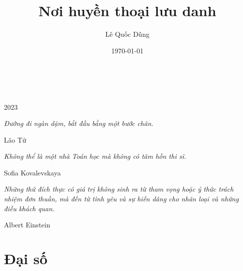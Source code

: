 \documentclass[oneside]{book}
\title{Nơi huyền thoại lưu danh}
\author{Lê Quốc Dũng}
\date{\today}
\begin{document}
\begin{titlepage}
		\\
			
		\vspace{10mm}
		\\
		\vspace{\fill}
		\centering \large{2023}
\end{titlepage}

\newpage

\vspace*{2cm}

\begin{center}
	{\Large 
			\textit{Đường đi ngàn dặm, bắt đầu bằng một bước chân.}
	}
	\Large{\parbox{10cm}{
		\begin{raggedleft}
		\vspace{.5cm}\hfill{Lão Tử}
		\end{raggedleft}
	}
}
\end{center}

\begin{center}
	{\Large 
			\textit{Không thể là một nhà Toán học mà không có tâm hồn thi sĩ.}
	}
	\Large{\parbox{10cm}{
		\begin{raggedleft}
		\vspace{.5cm}\hfill{Sofia Kovalevskaya}
		\end{raggedleft}
	}
}
\end{center}

\begin{center}
	{\Large 
			\textit{Những thứ đích thực có giá trị không sinh ra từ tham
			vọng hoặc ý thức trách nhiệm đơn thuần, mà đến từ tình yêu và
			sự hiến dâng cho nhân loại và những điều khách quan.}
	}
	\Large{\parbox{10cm}{
		\begin{raggedleft}
		\vspace{.5cm}\hfill{Albert Einstein}
		\end{raggedleft}
	}
}
\end{center}

\newpage

\tableofcontents

\newpage

%

\part{Đại số}


\end{document}
